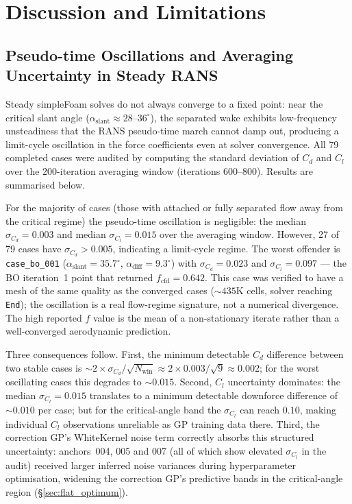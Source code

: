 \section{Discussion and Limitations}
\label{sec:discussion}

\subsection{Pseudo-time Oscillations and Averaging Uncertainty in Steady RANS}
\label{sec:des_statistics}

Steady simpleFoam solves do not always converge to a fixed point: near the critical slant angle ($\alpha_\mathrm{slant}\approx28$--$36^\circ$), the separated wake exhibits low-frequency unsteadiness that the RANS pseudo-time march cannot damp out, producing a limit-cycle oscillation in the force coefficients even at solver convergence. All 79 completed cases were audited by computing the standard deviation of $C_d$ and $C_l$ over the 200-iteration averaging window (iterations 600--800). Results are summarised below.

For the majority of cases (those with attached or fully separated flow away from the critical regime) the pseudo-time oscillation is negligible: the median $\sigma_{C_d} = 0.003$ and median $\sigma_{C_l} = 0.015$ over the averaging window. However, 27 of 79 cases have $\sigma_{C_d} > 0.005$, indicating a limit-cycle regime. The worst offender is \texttt{case\_bo\_001} ($\alpha_\mathrm{slant}=35.7^\circ$, $\alpha_\mathrm{diff}=9.3^\circ$) with $\sigma_{C_d}=0.023$ and $\sigma_{C_l}=0.097$ — the BO iteration~1 point that returned $f_\mathrm{cfd}=0.642$. This case was verified to have a mesh of the same quality as the converged cases (${\sim}435$K cells, solver reaching \texttt{End}); the oscillation is a real flow-regime signature, not a numerical divergence. The high reported $f$ value is the mean of a non-stationary iterate rather than a well-converged aerodynamic prediction.

Three consequences follow. First, the minimum detectable $C_d$ difference between two stable cases is ${\sim}2\times\sigma_{C_d}/\sqrt{N_\mathrm{win}}\approx 2\times0.003/\sqrt{9}\approx0.002$; for the worst oscillating cases this degrades to ${\sim}0.015$. Second, $C_l$ uncertainty dominates: the median $\sigma_{C_l}=0.015$ translates to a minimum detectable downforce difference of ${\sim}0.010$ per case; but for the critical-angle band the $\sigma_{C_l}$ can reach $0.10$, making individual $C_l$ observations unreliable as GP training data there. Third, the correction GP's WhiteKernel noise term correctly absorbs this structured uncertainty: anchors~004, 005 and 007 (all of which show elevated $\sigma_{C_l}$ in the audit) received larger inferred noise variances during hyperparameter optimisation, widening the correction GP's predictive bands in the critical-angle region (\S\ref{sec:flat_optimum}).

